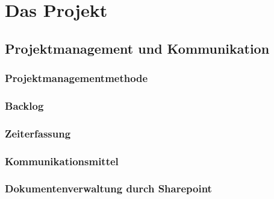 \chapter{Das Projekt}
\section{Projektmanagement und Kommunikation}
\subsection{Projektmanagementmethode}
\subsection{Backlog}
\subsection{Zeiterfassung}
\subsection{Kommunikationsmittel}
\subsection{Dokumentenverwaltung durch Sharepoint}
